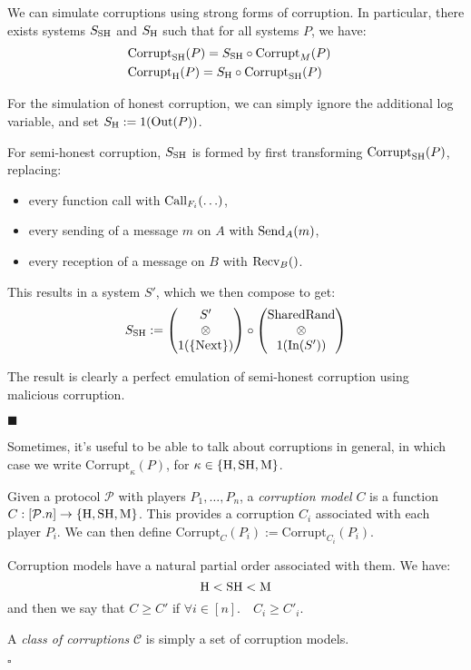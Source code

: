 \begin{lemma}
  \label{thm:simulatingcorruption}
  We can simulate corruptions using strong forms of corruption.
  In particular, there exists systems $S_{\text{SH}}$ and $S_{\text{H}}$ such that
  for all systems $P$, we have:
  \[
    \begin{aligned}
      &\text{Corrupt}_{\text{SH}}(P) = S_{\text{SH}} \circ \text{Corrupt}_M(P)\cr
      &\text{Corrupt}_{\text{H}}(P) = S_{\text{H}} \circ \text{Corrupt}_{\text{SH}}(P)
    \end{aligned}
  \]

For the simulation of honest corruption, we can simply ignore
  the additional log variable, and set $S_{\text{H}} := 1(\text{Out}(P))$.

For semi-honest corruption, $S_{\text{SH}}$ is formed by first transforming
$\text{Corrupt}_{\text{SH}}(P)$, replacing:
\begin{itemize}
  \item every function call with $\text{Call}_{F_i}(\ldots)$,
  \item every sending of a message $m$ on $A$ with $\text{Send}_A(m)$,
  \item every reception of a message on $B$ with $\text{Recv}_B()$.
\end{itemize}
This results in a system $S'$, which we then compose to get:
$$
S_{\text{SH}} :=
\begin{pmatrix}
  S'\cr
  \otimes\cr
  1(\{\text{Next}\})
\end{pmatrix}
\circ
\begin{pmatrix}
\text{SharedRand}\cr
\otimes\cr
1(\text{In}(S'))
\end{pmatrix}
$$

The result is clearly a perfect emulation of semi-honest corruption
using malicious corruption.

$\blacksquare$
\end{lemma}

Sometimes, it's useful to be able to talk about corruptions in general,
in which case we write $\text{Corrupt}_\kappa(P)$,
for $\kappa \in \{\text{H}, \text{SH}, \text{M}\}$.

\begin{definition}
Given a protocol $\mathcal{P}$ with players $P_1, \ldots, P_n$, a \emph{corruption model} $C$
is a function $C : [\mathcal{P}.n] \to \{\text{H}, \text{SH}, \text{M}\}$.
This provides a corruption $C_i$ associated with each player $P_i$.
We can then define $\text{Corrupt}_C(P_i) := \text{Corrupt}_{C_i}(P_i)$.

Corruption models have a natural partial order associated with them. 
We have:
$$
\text{H} < \text{SH} < \text{M}
$$
  and then we say that $C \geq C'$ if $\forall i \in [n]. \quad C_i \geq C'_i$.

A \emph{class of corruptions} $\mathcal{C}$ is simply a set of corruption models.

$\square$
\end{definition}

